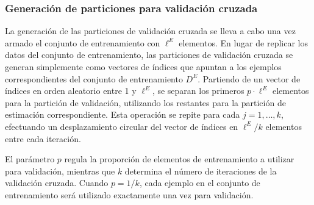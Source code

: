 %
%
\subsubsection{Generación de particiones para validación cruzada}
%
La generación de las particiones de validación cruzada se lleva a cabo
una vez armado el conjunto de entrenamiento con $\ell^E$ elementos.
En lugar de replicar los datos del conjunto de entrenamiento, las
particiones de validación cruzada se generan simplemente como vectores
de índices que apuntan a los ejemplos correspondientes del conjunto de
entrenamiento $D^E$. Partiendo de un vector de índices en orden
aleatorio entre 1 y $\ell^E$, se separan los primeros $p\cdot\ell^E$
elementos para la partición de validación, utilizando los restantes
para la partición de estimación correspondiente. Esta operación se
repite para cada $j=1,\ldots,k$, efectuando un desplazamiento circular
del vector de índices en $\ell^E/k$ elementos entre cada iteración.

El parámetro $p$ regula la proporción de elementos de entrenamiento a
utilizar para validación, mientras que $k$ determina el número de
iteraciones de la validación cruzada. Cuando $p=1/k$, cada ejemplo en
el conjunto de entrenamiento será utilizado exactamente una vez para
validación.
